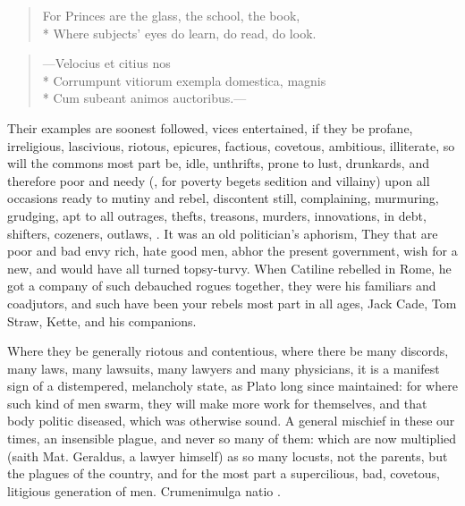 {\begin{verse}
For Princes are the glass, the school, the book,\\*
Where subjects' eyes do learn, do read, do look.
\end{verse}

\begin{verse}
---\textlatin{Velocius et citius nos}\\*
\textlatin{Corrumpunt vitiorum exempla domestica, magnis}\\*
\textlatin{Cum subeant animos auctoribus.}---
\end{verse}

Their examples are soonest followed, vices entertained, if they be
profane, irreligious, lascivious, riotous, epicures, factious,
covetous, ambitious, illiterate, so will the commons most part be,
idle, unthrifts, prone to lust, drunkards, and therefore poor and needy
(, for poverty begets sedition and
villainy) upon all occasions ready to mutiny and rebel, discontent
still, complaining, murmuring, grudging, apt to all outrages, thefts,
treasons, murders, innovations, in debt, shifters, cozeners, outlaws,
. It was an old politician's aphorism,
They that are poor and bad envy rich, hate good men, abhor the present
government, wish for a new, and would have all turned topsy-turvy. When
Catiline rebelled in Rome, he got a company of such debauched rogues
together, they were his familiars and coadjutors, and such have been
your rebels most part in all ages, Jack Cade, Tom Straw, Kette, and his
companions.

Where they be generally riotous and contentious, where there be many
discords, many laws, many lawsuits, many lawyers and many physicians,
it is a manifest sign of a distempered, melancholy state, as Plato
long since maintained: for where such kind of men swarm, they will make
more work for themselves, and that body politic diseased, which was
otherwise sound. A general mischief in these our times, an insensible
plague, and never so many of them: which are now multiplied (saith Mat.
Geraldus, a lawyer himself) as so many locusts, not the parents,
but the plagues of the country, and for the most part a supercilious,
bad, covetous, litigious generation of men. Crumenimulga natio \etc{}.

}
